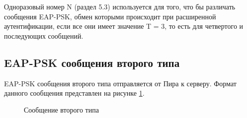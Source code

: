 Одноразовый номер N (раздел 5.3) используется для того, что бы различать сообщения EAP-PSK, обмен которыми происходит при расширенной аутентификации, если все они имеет значение T = 3, то есть для четвертого и последующих сообщений.

\subsection{EAP-PSK сообщения второго типа}

EAP-PSK сообщения второго типа отправляется от Пира к серверу. Формат данного сообщения представлен на рисунке \ref{img:message_type2}.

\begin{figure}[h!]
\caption{Сообщение второго типа}
\label{img:message_type2}
\end{figure}

